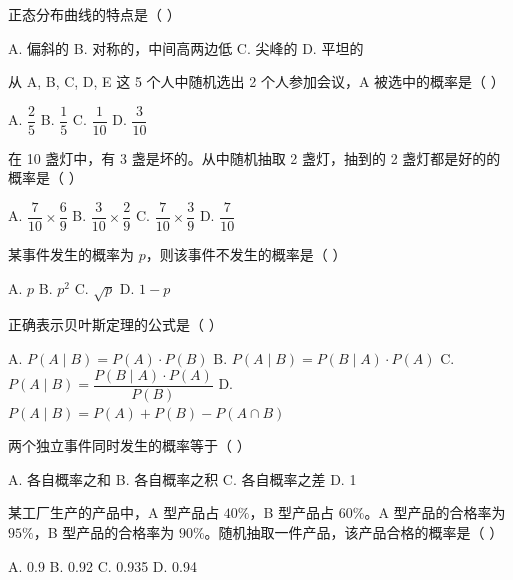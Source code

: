 \documentclass[11pt, a4paper]{article}
\begin{document}
\begin{baitap}[34]
正态分布曲线的特点是（ ）
\par\vspace{3pt}
\noindent A. 偏斜的 \quad B. 对称的，中间高两边低 \quad C. 尖峰的 \quad D. 平坦的
\end{baitap}

\begin{baitap}[35]
从 A, B, C, D, E 这 5 个人中随机选出 2 个人参加会议，A 被选中的概率是（ ）
\par\vspace{3pt}
\noindent A. $\dfrac{2}{5}$ \quad B. $\dfrac{1}{5}$ \quad C. $\dfrac{1}{10}$ \quad D. $\dfrac{3}{10}$
\end{baitap}

\begin{baitap}[36]
在 10 盏灯中，有 3 盏是坏的。从中随机抽取 2 盏灯，抽到的 2 盏灯都是好的的概率是（ ）
\par\vspace{3pt}
\noindent A. $\dfrac{7}{10} \times \dfrac{6}{9}$ \quad B. $\dfrac{3}{10} \times \dfrac{2}{9}$ \quad C. $\dfrac{7}{10} \times \dfrac{3}{9}$ \quad D. $\dfrac{7}{10}$
\end{baitap}

\begin{baitap}[37]
某事件发生的概率为 $p$，则该事件不发生的概率是（ ）
\par\vspace{3pt}
\noindent A. $p$ \quad B. $p^{2}$ \quad C. $\sqrt{p}$ \quad D. $1 - p$
\end{baitap}

\begin{baitap}[38]
正确表示贝叶斯定理的公式是（ ）
\par\vspace{3pt}
\noindent A. $P(A \mid B) = P(A) \cdot P(B)$ \quad B. $P(A \mid B) = P(B \mid A) \cdot P(A)$ \quad C. $P(A \mid B) = \dfrac{P(B \mid A) \cdot P(A)}{P(B)}$ \quad D. $P(A \mid B) = P(A) + P(B) - P(A \cap B)$
\end{baitap}

\begin{baitap}[39]
两个独立事件同时发生的概率等于（ ）
\par\vspace{3pt}
\noindent A. 各自概率之和 \quad B. 各自概率之积 \quad C. 各自概率之差 \quad D. 1
\end{baitap}

\begin{baitap}[40]
某工厂生产的产品中，A 型产品占 $40\%$，B 型产品占 $60\%$。A 型产品的合格率为 $95\%$，B 型产品的合格率为 $90\%$。随机抽取一件产品，该产品合格的概率是（ ）
\par\vspace{3pt}
\noindent A. 0.9 \quad B. 0.92 \quad C. 0.935 \quad D. 0.94
\end{baitap}
\end{document}
